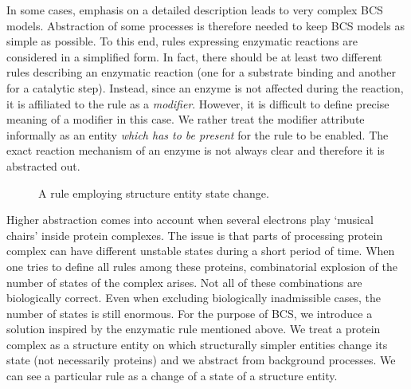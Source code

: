 \documentclass[12pt]{fithesis2}
\begin{document}
In some cases, emphasis on a detailed description leads to very complex BCS models. Abstraction of some processes is therefore needed to keep BCS models as simple as possible. To this end, rules expressing enzymatic reactions are considered in a simplified form. In fact, there should be at least two different rules describing an enzymatic reaction (one for a substrate binding and another for a catalytic step). Instead, since an enzyme is not affected during the reaction, it is affiliated to the rule as a \emph{modifier}. However, it is difficult to define precise meaning of a modifier in this case. We rather treat the modifier attribute informally as an entity \textit{which has to be present} for the rule to be enabled. The exact reaction mechanism of an enzyme is not always clear and therefore it is abstracted out.

\begin{figure}[!h]
\begin{center}
\end{center}
\caption{A rule employing structure entity state change.}
\end{figure}

Higher abstraction comes into account when several electrons play `musical chairs' inside protein complexes. The issue is that parts of processing protein complex can have different unstable states during a short period of time. When one tries to define all rules among these proteins, combinatorial explosion of the number of states of the complex arises. Not all of these combinations are biologically correct. Even when excluding biologically inadmissible cases, the number of states is still enormous. For the purpose of BCS, we introduce a solution inspired by the enzymatic rule mentioned above. We treat a protein complex as a structure entity on which structurally simpler entities change its state (not necessarily proteins) and we abstract from background processes. We can see a particular rule as a change of a state of a structure entity.
\end{document}
